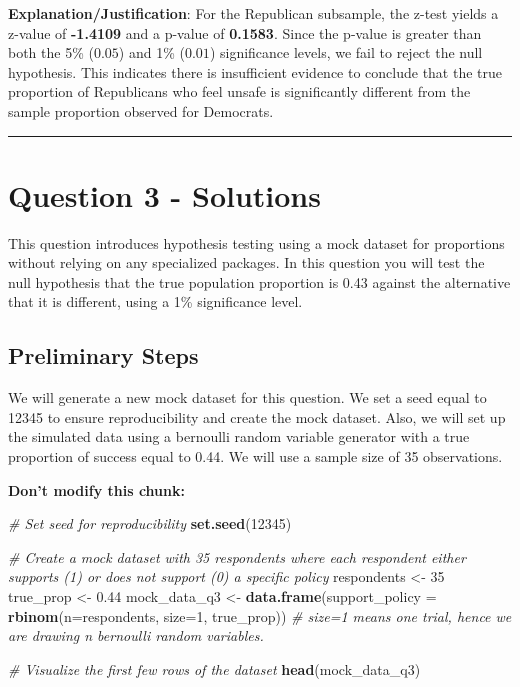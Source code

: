 \documentclass[
  11pt,
]{article}
\newenvironment{Shaded}{\begin{snugshade}}{\end{snugshade}}
\newcommand{\AttributeTok}[1]{\textcolor[rgb]{0.13,0.29,0.53}{#1}}
\newcommand{\CommentTok}[1]{\textcolor[rgb]{0.56,0.35,0.01}{\textit{#1}}}
\newcommand{\DecValTok}[1]{\textcolor[rgb]{0.00,0.00,0.81}{#1}}
\newcommand{\FloatTok}[1]{\textcolor[rgb]{0.00,0.00,0.81}{#1}}
\newcommand{\FunctionTok}[1]{\textcolor[rgb]{0.13,0.29,0.53}{\textbf{#1}}}
\newcommand{\NormalTok}[1]{#1}
\newcommand{\OtherTok}[1]{\textcolor[rgb]{0.56,0.35,0.01}{#1}}
\begin{document}
\textbf{Explanation/Justification}: For the Republican subsample, the
z-test yields a z-value of \textbf{-1.4109} and a p-value of
\textbf{0.1583}. Since the p-value is greater than both the 5\%
(\(0.05\)) and 1\% (\(0.01\)) significance levels, we fail to reject the
null hypothesis. This indicates there is insufficient evidence to
conclude that the true proportion of Republicans who feel unsafe is
significantly different from the sample proportion observed for
Democrats.

\begin{center}\rule{0.5\linewidth}{0.5pt}\end{center}

\section{Question 3 - Solutions}\label{question-3---solutions}

This question introduces hypothesis testing using a mock dataset for
proportions without relying on any specialized packages. In this
question you will test the null hypothesis that the true population
proportion is 0.43 against the alternative that it is different, using a
1\% significance level.

\subsection{Preliminary Steps}\label{preliminary-steps-1}

We will generate a new mock dataset for this question. We set a seed
equal to 12345 to ensure reproducibility and create the mock dataset.
Also, we will set up the simulated data using a bernoulli random
variable generator with a true proportion of success equal to 0.44. We
will use a sample size of 35 observations.

\textbf{Don't modify this chunk:}

\begin{Shaded}
\begin{Highlighting}[]
\CommentTok{\# Set seed for reproducibility}
\FunctionTok{set.seed}\NormalTok{(}\DecValTok{12345}\NormalTok{)}

\CommentTok{\# Create a mock dataset with 35 respondents where each respondent either supports (1) or does not support (0) a specific policy}
\NormalTok{respondents }\OtherTok{\textless{}{-}} \DecValTok{35}
\NormalTok{true\_prop }\OtherTok{\textless{}{-}} \FloatTok{0.44}
\NormalTok{mock\_data\_q3 }\OtherTok{\textless{}{-}} \FunctionTok{data.frame}\NormalTok{(}\AttributeTok{support\_policy =} \FunctionTok{rbinom}\NormalTok{(}\AttributeTok{n=}\NormalTok{respondents, }\AttributeTok{size=}\DecValTok{1}\NormalTok{, true\_prop))  }\CommentTok{\# size=1 means one trial, hence we are drawing \textquotesingle{}n\textquotesingle{} bernoulli random variables.}

\CommentTok{\# Visualize the first few rows of the dataset}
\FunctionTok{head}\NormalTok{(mock\_data\_q3)}
\end{Highlighting}
\end{Shaded}
\end{document}
